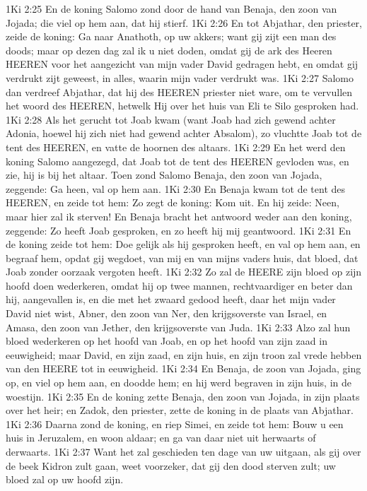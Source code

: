 1Ki 2:25  En de koning Salomo zond door de hand van Benaja, den zoon van Jojada; die viel op hem aan, dat hij stierf.
1Ki 2:26  En tot Abjathar, den priester, zeide de koning: Ga naar Anathoth, op uw akkers; want gij zijt een man des doods; maar op dezen dag zal ik u niet doden, omdat gij de ark des Heeren HEEREN voor het aangezicht van mijn vader David gedragen hebt, en omdat gij verdrukt zijt geweest, in alles, waarin mijn vader verdrukt was.
1Ki 2:27  Salomo dan verdreef Abjathar, dat hij des HEEREN priester niet ware, om te vervullen het woord des HEEREN, hetwelk Hij over het huis van Eli te Silo gesproken had.
1Ki 2:28  Als het gerucht tot Joab kwam (want Joab had zich gewend achter Adonia, hoewel hij zich niet had gewend achter Absalom), zo vluchtte Joab tot de tent des HEEREN, en vatte de hoornen des altaars.
1Ki 2:29  En het werd den koning Salomo aangezegd, dat Joab tot de tent des HEEREN gevloden was, en zie, hij is bij het altaar. Toen zond Salomo Benaja, den zoon van Jojada, zeggende: Ga heen, val op hem aan.
1Ki 2:30  En Benaja kwam tot de tent des HEEREN, en zeide tot hem: Zo zegt de koning: Kom uit. En hij zeide: Neen, maar hier zal ik sterven! En Benaja bracht het antwoord weder aan den koning, zeggende: Zo heeft Joab gesproken, en zo heeft hij mij geantwoord.
1Ki 2:31  En de koning zeide tot hem: Doe gelijk als hij gesproken heeft, en val op hem aan, en begraaf hem, opdat gij wegdoet, van mij en van mijns vaders huis, dat bloed, dat Joab zonder oorzaak vergoten heeft.
1Ki 2:32  Zo zal de HEERE zijn bloed op zijn hoofd doen wederkeren, omdat hij op twee mannen, rechtvaardiger en beter dan hij, aangevallen is, en die met het zwaard gedood heeft, daar het mijn vader David niet wist, Abner, den zoon van Ner, den krijgsoverste van Israel, en Amasa, den zoon van Jether, den krijgsoverste van Juda.
1Ki 2:33  Alzo zal hun bloed wederkeren op het hoofd van Joab, en op het hoofd van zijn zaad in eeuwigheid; maar David, en zijn zaad, en zijn huis, en zijn troon zal vrede hebben van den HEERE tot in eeuwigheid.
1Ki 2:34  En Benaja, de zoon van Jojada, ging op, en viel op hem aan, en doodde hem; en hij werd begraven in zijn huis, in de woestijn.
1Ki 2:35  En de koning zette Benaja, den zoon van Jojada, in zijn plaats over het heir; en Zadok, den priester, zette de koning in de plaats van Abjathar.
1Ki 2:36  Daarna zond de koning, en riep Simei, en zeide tot hem: Bouw u een huis in Jeruzalem, en woon aldaar; en ga van daar niet uit herwaarts of derwaarts.
1Ki 2:37  Want het zal geschieden ten dage van uw uitgaan, als gij over de beek Kidron zult gaan, weet voorzeker, dat gij den dood sterven zult; uw bloed zal op uw hoofd zijn.
